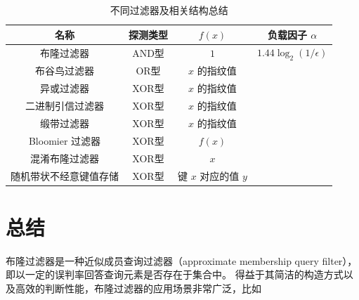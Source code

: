 \begin{table}[ht]
  \centering
  \caption{不同过滤器及相关结构总结}
  \label{tab:construct}
  \begin{tabular}{cccc}
    \toprule
    名称  &  探测类型  &  $f(x)$  & 负载因子 $\alpha$ \\
    \midrule
    布隆过滤器  &  AND型  &  $1$ & $1.44\log_2(1/\epsilon)$  \\
    布谷鸟过滤器  &  OR型  &  $x$ 的指纹值 &   \\
    异或过滤器  &  XOR型  &  $x$ 的指纹值 &  \\
    二进制引信过滤器  & XOR型  &  $x$ 的指纹值 &  \\
    缎带过滤器 & XOR型 & $x$ 的指纹值 &  \\
    Bloomier 过滤器  &  XOR型  &  $f(x)$ & \\
    混淆布隆过滤器  &  XOR型  &  $x$ & \\
    随机带状不经意键值存储 &  XOR型  &  键 $x$ 对应的值 $y$ & \\
    \bottomrule
  \end{tabular}
\end{table}

\section{总结}

布隆过滤器是一种近似成员查询过滤器（approximate membership query filter），即以一定的误判率回答查询元素是否存在于集合中。
得益于其简洁的构造方式以及高效的判断性能，布隆过滤器的应用场景非常广泛，比如






